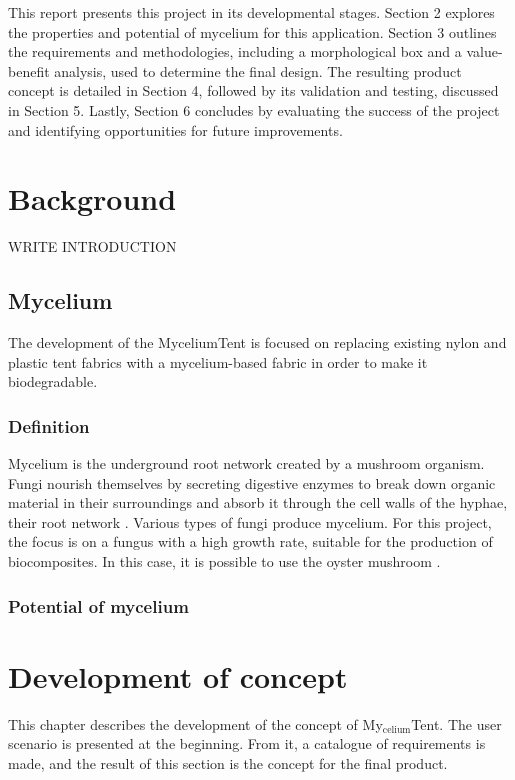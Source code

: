 \documentclass{article}
\newcommand{\myc}{My$_{\text{celium}}$Tent}
\begin{document}
This report presents this project in its developmental stages. Section 2 explores the
properties and potential of mycelium for this application. Section 3 outlines the
requirements and methodologies, including a morphological box and a value-benefit
analysis, used to determine the final design. The resulting product concept is detailed in
Section 4, followed by its validation and testing, discussed in Section 5. Lastly,
Section 6 concludes by evaluating the success of the project and identifying opportunities
for future improvements.


\newpage
\section{Background}
WRITE INTRODUCTION

\subsection{Mycelium}
The development of the MyceliumTent is focused on replacing existing nylon and plastic
tent fabrics with a mycelium-based fabric in order to make it biodegradable.

\subsubsection{Definition}
Mycelium is the underground root network created by a mushroom organism. Fungi
nourish themselves by secreting digestive enzymes to break down organic material in
their surroundings and absorb it through the cell walls of the hyphae, their root network
\parencite{fungus}. Various types of fungi produce mycelium. For this project, the focus
is on a fungus with a high growth rate, suitable for the production of biocomposites. In
this case, it is possible to use the oyster mushroom \parencite{mushroom}.

\subsubsection{Potential of mycelium}







\newpage
\section{Development of concept}
This chapter describes the development of the concept of \myc.
The user scenario is presented at the beginning. From it, a catalogue
of requirements is made, and the result of this section is the
concept for the final product.
\end{document}
